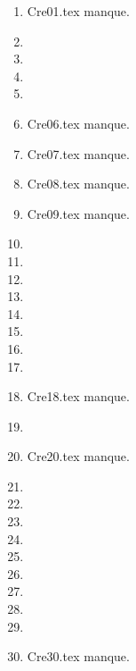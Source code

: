 \begin{enumerate}
  \item Cre01.tex manque. 
  \item  
  \item  
  \item  
  \item  
  \item Cre06.tex manque. 
  \item Cre07.tex manque. 
  \item Cre08.tex manque. 
  \item Cre09.tex manque. 
  \item  
  \item  
  \item  
  \item  
  \item  
  \item  
  \item  
  \item  
  \item Cre18.tex manque. 
  \item  
  \item Cre20.tex manque. 
  \item  
  \item  
  \item  
  \item  
  \item  
  \item  
  \item  
  \item  
  \item  
  \item Cre30.tex manque. 
\end{enumerate} 

